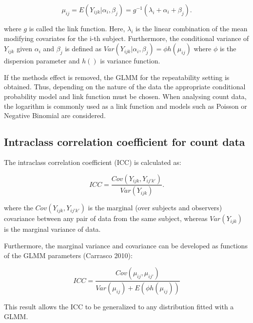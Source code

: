 \begin{equation}
\mu_{ij}=E\left(Y_{ijk}|\alpha_i,\beta_j\right)=g^{-1}\left(\lambda_i+\alpha_i+\beta_j\right).
\label{eq:glmm}
\end{equation}

where \(g\) is called the link function. Here, \(\lambda_i\) is the linear combination of the mean modifying covariates for the i-th subject.
Furthermore, the conditional variance of \(Y_{ijk}\) given \(\alpha_i\) and \(\beta_j\) is defined as \(Var\left(Y_{ijk}|\alpha_i,\beta_j\right)=\phi h\left(\mu_{ij}\right)\) where \(\phi\) is the dispersion parameter and \(h\left(\right)\) is variance function.

If the methods effect is removed, the GLMM for the repeatability setting is obtained.
Thus, depending on the nature of the data the appropriate conditional probability model and link function must be chosen. When analysing count data, the logarithm is commonly used as a link function and models such as Poisson or Negative Binomial are considered.

\hypertarget{intraclass-correlation-coefficient-for-count-data}{%
\subsection{Intraclass correlation coefficient for count data}\label{intraclass-correlation-coefficient-for-count-data}}

The intraclass correlation coefficient (ICC) is calculated as:

\begin{equation}
ICC=\frac{Cov\left(Y_{ijk},Y_{ij'k'}\right)}{Var\left(Y_{ijk}\right)}.
\label{eq:icc}
\end{equation}

where the \(Cov\left(Y_{ijk},Y_{ij'k'}\right)\) is the marginal (over subjects and observers) covariance between any pair of data from the same subject, whereas \(Var\left(Y_{ijk}\right)\) is the marginal variance of data.

Furthermore, the marginal variance and covariance can be developed as functions of the GLMM parameters (Carrasco 2010):

\begin{equation}
ICC=\frac{Cov\left(\mu_{ij},\mu_{ij'}\right)}{Var\left(\mu_{ij}\right)+E\left(\phi h\left(\mu_{ij}\right)\right)}
\label{eq:icc2}
\end{equation}

This result allows the ICC to be generalized to any distribution fitted with a GLMM.

